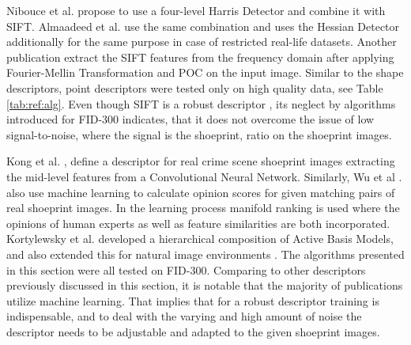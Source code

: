 \documentclass[draft,final]{vutinfth} %
\begin{document}
Nibouce et al. \cite{nibouche2009rotation} propose to use a four-level Harris Detector and combine it with SIFT.
Almaadeed et al. \cite{almaadeed2015partial} use the same combination and uses the Hessian Detector additionally for the same purpose in case of restricted real-life datasets.
Another publication \cite{richetelli2017classification} extract the SIFT features from the frequency domain after applying Fourier-Mellin Transformation and POC on the input image.
Similar to the shape descriptors, point descriptors were tested only on high quality data, see Table \ref{tab:ref:alg}.
Even though SIFT is a robust descriptor  \cite{lowe1999object}, its neglect by algorithms introduced for FID-300 indicates, that it does not overcome the issue of low signal-to-noise, where the signal is the shoeprint, ratio on the shoeprint images.
\par
Kong et al. \cite{kong2017cross}, \cite{kong2019cross} define a descriptor for real crime scene shoeprint images extracting the mid-level features from a Convolutional Neural Network.
Similarly, Wu et al .\cite{wu2019losgsr} also use machine learning to calculate opinion scores for given matching pairs of real shoeprint images.
In the learning process manifold ranking is used where the opinions of human experts as well as feature similarities are both incorporated.
Kortylewsky et al. \cite{kortylewski2016probabilistic} developed a hierarchical composition of Active Basis Models, and also extended this for natural image environments \cite{kortylewski2019greedy}.
The algorithms presented in this section were all tested on FID-300.
Comparing to other descriptors previously discussed in this section, it is notable that the majority of publications utilize machine learning.
That implies that for a robust descriptor training is indispensable, and to deal with the varying and high amount of noise the descriptor needs to be adjustable and adapted to the given shoeprint images.
\end{document}
